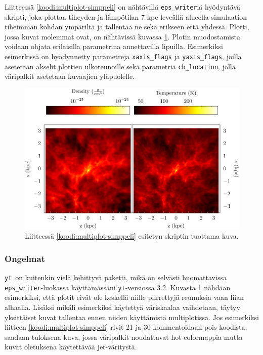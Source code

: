 \documentclass[12pt,a4paper]{article}
\newcommand{\yt}{\texttt{yt}}
\begin{document}
Liitteessä \ref{koodi:multiplot-simppeli} on nähtävillä \texttt{eps\_writer}iä hyödyntävä skripti, joka plottaa tiheyden ja lämpötilan 7 kpc leveällä alueella simulaation tiheimmän kohdan ympäriltä ja tallentaa ne sekä erikseen että yhdessä. Plotti, jossa kuvat molemmat ovat, on nähtävissä kuvassa \ref{fig:multiplot-simppeli}. Plotin muodostamista voidaan ohjata erilaisilla parametrina annettavilla lipuilla. Esimerkiksi esimerkissä on hyödynnetty parametreja \texttt{xaxis\_flags} ja \texttt{yaxis\_flags}, joilla asetetaan akselit plottien ulkoreunoille sekä parametria \texttt{cb\_location}, jolla väripalkit asetetaan kuvaajien yläpuolelle.

\begin{figure}
   \centering
   \includegraphics[width=\textwidth]{../kuvat/EPSMultiPlot.png}
   \caption{Liitteessä \ref{koodi:multiplot-simppeli} esitetyn skriptin tuottama kuva.} \label{fig:multiplot-simppeli}
\end{figure}

\subsubsection{Ongelmat}
\yt\ on kuitenkin vielä kehittyvä paketti, mikä on selvästi huomattavissa \texttt{eps\_writer}-luokassa käyttämässäni \yt -versiossa 3.2. Kuvasta \ref{fig:multiplot-simppeli} nähdään esimerkiksi, että plotit eivät ole keskellä niille piirrettyjä reunuksia vaan liian alhaalla. Lisäksi mikäli esimerkiksi käytettyä väriskaalaa vaihdetaan, täytyy yksittäiset kuvat tallentaa ennen niiden käyttämistä multiplotissa. Jos esimerkiksi liitteen \ref{koodi:multiplot-simppeli} rivit 21 ja 30 kommentoidaan pois koodista, saadaan tuloksena kuva, jossa väripalkit noudattavat hot-colormappia mutta kuvat oletuksena käytettävää jet-väritystä.
\end{document}
